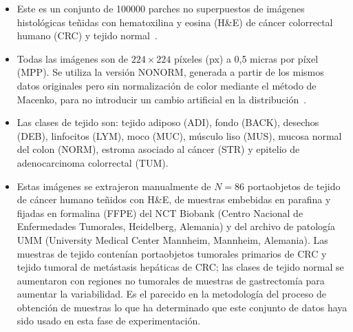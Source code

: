 \begin{itemize}
  \item Este es un conjunto de \num{100000} parches no superpuestos de imágenes histológicas teñidas con hematoxilina y eosina (H\&E) de cáncer colorrectal humano (CRC) y tejido normal~\cite{kather2018,kather2019}.
  \item Todas las imágenes son de $224 \times 224$ píxeles (px) a 0,5 micras por píxel (MPP). Se utiliza la versión NONORM, generada a partir de los mismos datos originales pero sin normalización de color mediante el método de Macenko, para no introducir un cambio artificial en la distribución~\cite{macenko2009}.
  \item Las clases de tejido son: tejido adiposo (ADI), fondo (BACK), desechos (DEB), linfocitos (LYM), moco (MUC), músculo liso (MUS), mucosa normal del colon (NORM), estroma asociado al cáncer (STR) y epitelio de adenocarcinoma colorrectal (TUM).
  \item Estas imágenes se extrajeron manualmente de $N = 86$ portaobjetos de tejido de cáncer humano teñidos con H\&E, de muestras embebidas en parafina y fijadas en formalina (FFPE) del NCT Biobank (Centro Nacional de Enfermedades Tumorales, Heidelberg, Alemania) y del archivo de patología UMM (University Medical Center Mannheim, Mannheim, Alemania).
   Las muestras de tejido contenían portaobjetos tumorales primarios de CRC y tejido tumoral de metástasis hepáticas de CRC; las clases de tejido normal se aumentaron con regiones no tumorales de muestras de gastrectomía para aumentar la variabilidad. Es el parecido en la metodología del proceso de obtención de muestras lo que ha determinado que este conjunto de datos haya sido usado en esta fase de experimentación.
\end{itemize}

